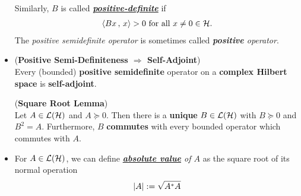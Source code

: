 \documentclass[11pt]{article}
\begin{document}
\begin{itemize}
\begin{definition}
Similarly, $B$ is called \underline{\emph{\textbf{positive-definite}}} if 
\begin{align*}
\left\langle Bx\,,\, x \right\rangle> 0\text{ for all }x \neq 0 \in {\mathcal H}.
\end{align*} The \emph{positive semidefinite operator} is sometimes called \emph{\textbf{positive} operator}. 
\end{definition}

\item \begin{proposition} (\textbf{Positive Semi-Definiteness $\Rightarrow$ Self-Adjoint}) \citep{reed1980methods} \\
Every (bounded) \textbf{positive semidefinite} operator on a \textbf{complex Hilbert space} is \textbf{self-adjoint}. 
\end{proposition}

\begin{theorem} (\textbf{Square Root Lemma})  \citep{reed1980methods}\\ 
Let $A \in {\mathcal L}({\mathcal H})$ and $A \succeq 0$. Then there is a \textbf{unique} $B \in {\mathcal L}({\mathcal H})$ with $B \succeq 0$ and $B^2 = A$. Furthermore, $B$ 
\textbf{commutes} with every bounded operator which commutes with $A$. 
\end{theorem}

\item \begin{definition}
For $A \in {\mathcal L}({\mathcal H})$, we can define \emph{\underline{\textbf{absolute value}} of $A$} as the square root of its normal operation
\begin{align*}
\left\lvert A \right\rvert := \sqrt{A^{*}A }
\end{align*} 
\end{definition}
\end{itemize}
\end{document}
